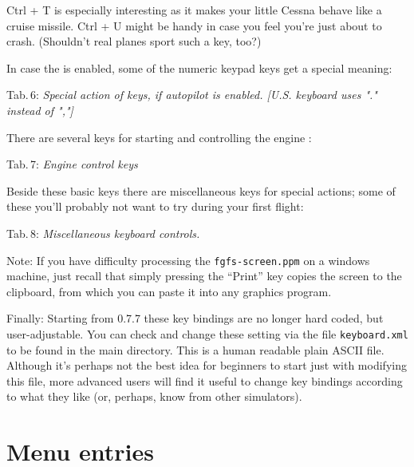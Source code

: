 \centerline{}
\medskip

\noindent Ctrl + T is especially interesting as it makes your little Cessna behave
like a cruise missile. Ctrl + U might be handy in case you feel you're just about to
crash. (Shouldn't real planes sport such a key, too?)

In case the  is enabled, some of the numeric keypad keys get a special
meaning:

\noindent
 Tab.\,6: \textit{Special action of keys, if autopilot is
 enabled. [U.S. keyboard uses "." instead of ","]}
\medskip

\centerline{}
\medskip

There are several keys for starting and controlling the engine :

\noindent
 Tab.\,7: \textit{Engine control keys}
\medskip

\centerline{}
\medskip

Beside these basic keys there are miscellaneous keys for special
actions; some of these you'll probably not want to try during your
first flight:
\vfill
\eject

\noindent Tab.\,8: \textit{Miscellaneous keyboard controls.}
\medskip

\centerline{}
\medskip

\noindent
 Note: If you have difficulty processing the  \texttt{fgfs-screen.ppm}
on a windows machine, just recall that simply pressing the ``Print'' key copies the
screen to the clipboard, from which you can paste it into any graphics program.

Finally: Starting from \FlightGear{} 0.7.7  these key bindings are no longer hard coded, but user-adjustable.
You can check and change these setting via the file
\texttt{keyboard.xml} to be found in the main
\FlightGear{} directory. This is a human readable plain ASCII file.
Although it's perhaps not the best idea for beginners to start just
with modifying this file, more advanced users will find it useful to
change key bindings according to what they like (or, perhaps, know from
other simulators).

\section{Menu entries}

